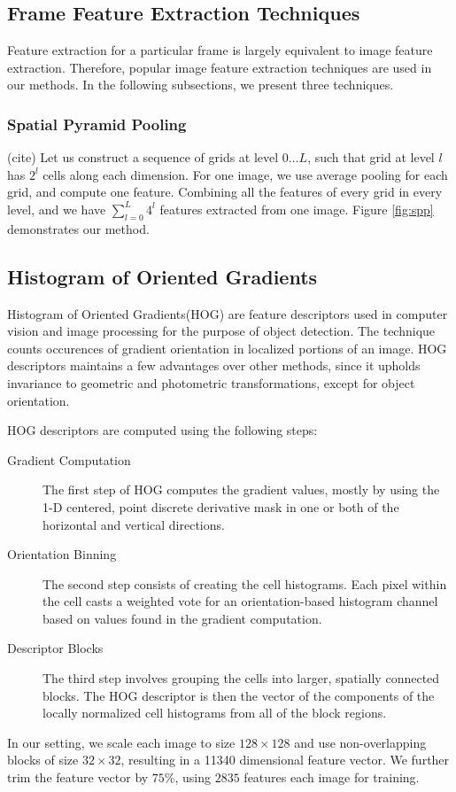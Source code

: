 \subsection{Frame Feature Extraction Techniques}
Feature extraction for a particular frame is largely equivalent to image feature extraction. Therefore, popular image feature extraction techniques are used in our methods. In the following subsections, we present three techniques.
\subsubsection{Spatial Pyramid Pooling}(cite)
Let us construct a sequence of grids at level $0 \ldots L$, such that grid at level $l$ has $2^l$ cells along each dimension. For one image, we use average pooling for each grid, and compute one feature. Combining all the features of every grid in every level, and we have $\sum_{l=0}^{L} 4^l$ features extracted from one image. Figure \ref{fig:spp} demonstrates our method.


\subsection{Histogram of Oriented Gradients}
Histogram of Oriented Gradients(HOG) are feature descriptors used in computer vision and image processing for the purpose of object detection. The technique counts occurences of gradient orientation in localized portions of an image. HOG descriptors maintains a few advantages over other methods, since it upholds invariance to geometric and photometric transformations, except for object orientation.\par
HOG descriptors are computed using the following steps:
\begin{description}
\item[Gradient Computation] The first step of HOG computes the gradient values, mostly by using the 1-D centered, point discrete derivative mask in one or both of the horizontal and vertical directions.
\item[Orientation Binning] The second step consists of creating the cell histograms. Each pixel within the cell casts a weighted vote for an orientation-based histogram channel based on values found in the gradient computation.
\item[Descriptor Blocks] The third step involves grouping the cells into larger, spatially connected blocks. The HOG descriptor is then the vector of the components of the locally normalized cell histograms from all of the block regions.
\end{description}
In our setting, we scale each image to size $128 \times 128$ and use non-overlapping blocks of size $32 \times 32$, resulting in a 11340 dimensional feature vector. We further trim the feature vector by $75\%$, using $2835$ features each image for training.

